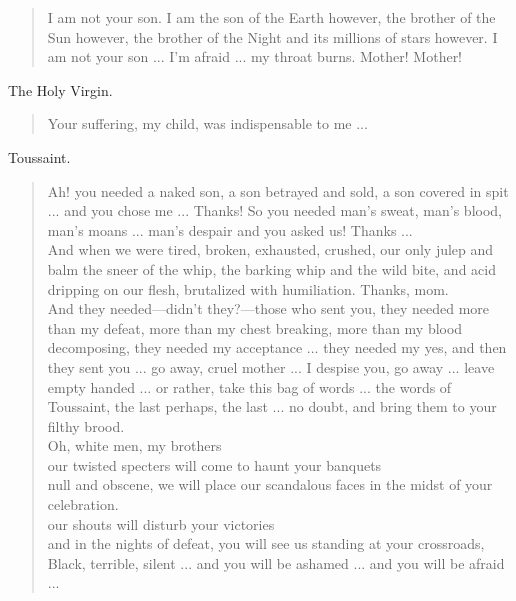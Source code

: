 \documentclass[letterpaper,article,12pt,oneside,notitlepage]{memoir}
\begin{document}
\begin{verse}
\indent I am not your son. I am the son of the Earth however, the brother of the Sun however, the brother of the Night and its millions of stars however. I am not your son ... I'm afraid ... my throat burns. Mother! Mother!  \\
\end{verse}

\begin{center}The Holy Virgin.\end{center}

\begin{verse}
\hspace{1cm} Your suffering, my child, was indispensable to me ...\\
\end{verse}

\begin{center}Toussaint.\end{center}

\begin{verse}
\indent Ah! you needed a naked son, a son betrayed and sold, a son covered in spit ... and you chose me ... Thanks! So you needed man's sweat, man's blood, man's moans ... man's despair and you asked us! Thanks ...  \\
\indent And when we were tired, broken, exhausted, crushed, our only julep and balm the sneer of the whip, the barking whip and the wild bite, and acid dripping on our flesh, brutalized with humiliation. Thanks, mom.   \\
\indent And they needed---didn't they?---those who sent you, they needed more than my defeat, more than my chest breaking, more than my blood decomposing, they needed my acceptance ... they needed my yes, and then they sent you ... go away, cruel mother ... I despise you, go away ... leave empty handed ... or rather, take this bag of words ... the words of Toussaint, the last perhaps, the last ... no doubt, and bring them to your filthy brood.  \\
\hspace{1cm} Oh, white men, my brothers \\
our twisted specters will come to haunt your banquets \\
null and obscene, we will place our scandalous faces in the midst of your celebration.  \\
our shouts will disturb your victories \\
and in the nights of defeat, you will see us standing at your crossroads, Black, terrible, silent ... and you will be ashamed ... and you will be afraid ...  \\
\end{verse}
\end{document}
